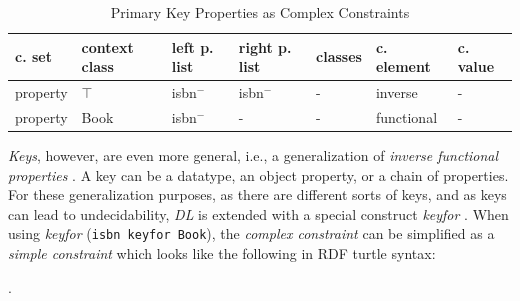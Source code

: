 \documentclass[a4paper,fontsize=11pt]{scrartcl}
\newcommand{\ms}[1]{\texttt{#1}}
\begin{document}
\begin{table}[H]
  \scriptsize
  \sffamily
  \vspace{0cm}
	\caption{Primary Key Properties as Complex Constraints}
	\label{tab:primary-key-properties-as-complex-constraints}
	\centering
		\begin{tabular}{l|l|l|l|l|l|l}
      \textbf{c. set} & \textbf{context class} & \textbf{left p. list} & \textbf{right p. list} & \textbf{classes} & \textbf{c. element} & \textbf{c. value} \\
      \hline
property & $\top$ & isbn$^{-}$ & isbn$^{-}$ & - & inverse & - \\
property & Book & isbn$^{-}$ & - & - & functional & - \\
		\end{tabular}
\end{table}

\emph{Keys}, however, are even more general, i.e., a generalization of \emph{inverse functional properties} \cite{Schneider2009}.
A key can be a datatype, an object property, or a chain of properties.
For these generalization purposes, as there are different sorts of keys, and as keys can lead to undecidability, 
\emph{DL} is extended with a special construct \emph{keyfor} \cite{Lutz2005}.
When using \emph{keyfor} (\ms{isbn keyfor Book}), 
the \emph{complex constraint} can be simplified as a \emph{simple constraint} which looks like the following in RDF turtle syntax:



\begin{ex} .
\end{ex}
\end{document}
